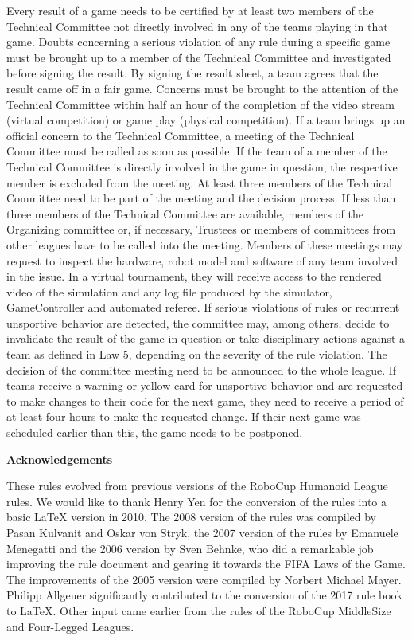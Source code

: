 \bigskip

Every result of a game needs to be certified by at least two members of the Technical Committee not directly involved in any of the teams playing in that game.
Doubts concerning a serious violation of any rule during a specific game must be
brought up to a member of the Technical Committee and investigated before
signing the result.
By signing the result sheet, a team agrees that the result came off in
a fair game.
Concerns must be brought to the attention of the Technical Committee
  within half an hour of the completion of the video stream (virtual competition) or game play (physical competition).
If a team brings up an official concern to the Technical Committee, a meeting of
the Technical Committee must be called as soon as possible.
If the team of a member of the Technical Committee is directly involved in the
game in question, the respective member is excluded from the meeting.
At least three members of the Technical Committee need to be part of the meeting
and the decision process.
If less than three members of the Technical Committee are available,
members of the Organizing committee or, if necessary,
Trustees or members of committees from other leagues have to be called into the
meeting.
Members of these meetings may request to inspect the hardware,
robot model and software of any team involved in the issue.
In a virtual tournament, they will receive access to the rendered video of the
  simulation and any log file produced by the simulator, GameController and
  automated referee.
If serious violations of rules or recurrent unsportive behavior
are detected, the committee may, among others, decide to invalidate the result
of the game in question or take disciplinary actions against a team as defined
in Law 5, depending on the severity of the rule violation.
The decision of the committee meeting need to be announced to the whole league.
If teams receive a warning or yellow card for unsportive behavior and are
  requested to make changes to their code for the next game, they need to
  receive a period of at least four hours to make the requested change.
  If their next game was scheduled earlier than this, the game needs to be
  postponed.


\bigskip

{\bfseries Acknowledgements}

\headlinebox

These rules evolved from previous versions of the RoboCup Humanoid League rules. We would like to thank Henry Yen for the conversion of the rules into a basic LaTeX version in 2010. The 2008 version of the rules was compiled by Pasan Kulvanit and Oskar von Stryk, the 2007 version of the rules by Emanuele Menegatti and the 2006 version by Sven Behnke, who did a remarkable job improving the rule document and gearing it towards the FIFA Laws of the Game. The improvements of the 2005 version were compiled by Norbert Michael Mayer. Philipp Allgeuer significantly contributed to the conversion of the 2017 rule book to LaTeX.  Other input came earlier from the rules of the RoboCup MiddleSize and Four-Legged Leagues.

